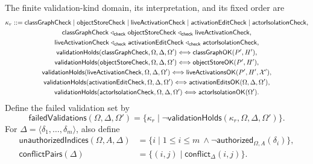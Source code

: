 The finite validation-kind domain, its interpretation, and its fixed order are
{\small
\begin{equation}\label{eq:reflection-validation-kinds}
\begin{gathered}
 \kappa_r::=\mathsf{classGraphCheck}\mid\mathsf{objectStoreCheck}
  \mid\mathsf{liveActivationCheck}\mid\mathsf{activationEditCheck}
  \mid\mathsf{actorIsolationCheck},\\
 \mathsf{classGraphCheck}\mathrel{\triangleleft_{\mathsf{check}}}
 \mathsf{objectStoreCheck}\mathrel{\triangleleft_{\mathsf{check}}}
 \mathsf{liveActivationCheck},\\
 \mathsf{liveActivationCheck}\mathrel{\triangleleft_{\mathsf{check}}}
 \mathsf{activationEditCheck}\mathrel{\triangleleft_{\mathsf{check}}}
 \mathsf{actorIsolationCheck},\\
 \mathsf{validationHolds}(\mathsf{classGraphCheck},\Omega,\Delta,\Omega')
  \Longleftrightarrow\mathsf{classGraphOK}(P',H'),\\
 \mathsf{validationHolds}(\mathsf{objectStoreCheck},\Omega,\Delta,\Omega')
  \Longleftrightarrow\mathsf{objectStoreOK}(P',H'),\\
 \mathsf{validationHolds}(\mathsf{liveActivationCheck},\Omega,\Delta,\Omega')
  \Longleftrightarrow\mathsf{liveActivationsOK}(P',H',\mathcal X'),\\
 \mathsf{validationHolds}(\mathsf{activationEditCheck},\Omega,\Delta,\Omega')
  \Longleftrightarrow\mathsf{activationEditsOK}(\Omega,\Delta,\Omega'),\\
 \mathsf{validationHolds}(\mathsf{actorIsolationCheck},\Omega,\Delta,\Omega')
  \Longleftrightarrow\mathsf{actorIsolationOK}(\Omega').
\end{gathered}
\end{equation}
}
Define the failed validation set by
\begin{equation}\label{eq:failed-reflection-validations}
 \mathsf{failedValidations}(\Omega,\Delta,\Omega')=
 \{\kappa_r\mid
   \neg\mathsf{validationHolds}(\kappa_r,\Omega,\Delta,\Omega')\}.
\end{equation}
For $\Delta=\langle\delta_1,\ldots,\delta_m\rangle$, also define
\begin{equation}\label{eq:reflection-error-index-sets}
\begin{aligned}
 \mathsf{unauthorizedIndices}(\Omega,A,\Delta)
  &=\{i\mid1\le i\le m\ \land
       \neg\mathsf{authorized}_{\Omega,A}(\delta_i)\},\\
 \mathsf{conflictPairs}(\Delta)
  &=\{(i,j)\mid\mathsf{conflict}_{\Delta}(i,j)\}.
\end{aligned}
\end{equation}
